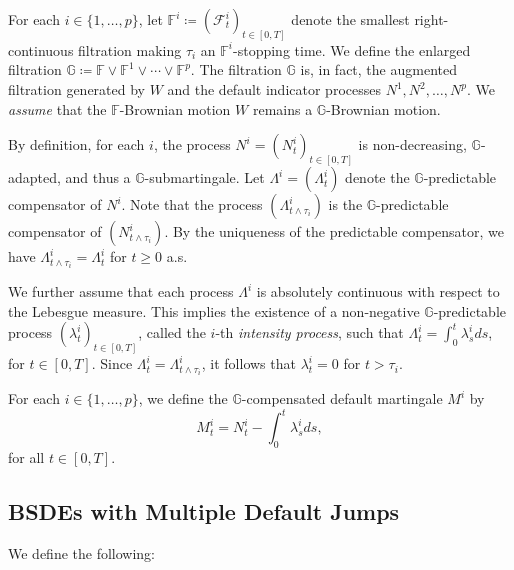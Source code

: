 \documentclass[11pt,a4paper]{article}
\numberwithin{equation}{section}
\theoremstyle{newPlain}
\theoremstyle{newDefinition}
\theoremstyle{newRemark}
\begin{document}
For each $i \in \{1, \ldots, p\}$, let $\mathbb{F}^i \coloneqq (\mathcal{F}_t^i)_{t \in [0, T]}$ denote the smallest right-continuous filtration making $\tau_i$ an $\mathbb{F}^i$-stopping time. We define the enlarged filtration $\mathbb{G} \coloneqq \mathbb{F} \vee \mathbb{F}^1 \vee \cdots \vee \mathbb{F}^p$. The filtration $\mathbb{G}$ is, in fact, the augmented filtration generated by $W$ and the default indicator processes $N^1, N^2, \ldots, N^p$. We \textit{assume} that the $\mathbb{F}$-Brownian motion $W$ remains a $\mathbb{G}$-Brownian motion.

By definition, for each $i$, the process $N^i = (N_t^i)_{t \in [0, T]}$ is non-decreasing, $\mathbb{G}$-adapted, and thus a $\mathbb{G}$-submartingale. Let $\Lambda^i = (\Lambda_t^i)$ denote the $\mathbb{G}$-predictable compensator of $N^i$. Note that the process $(\Lambda_{t \wedge \tau_i}^i)$ is the $\mathbb{G}$-predictable compensator of $(N_{t \wedge \tau_i}^i)$. By the uniqueness of the predictable compensator, we have $\Lambda_{t \wedge \tau_i}^i = \Lambda^i_t$ for $t \ge 0$ a.s.

We further assume that each process $\Lambda^i$ is absolutely continuous with respect to the Lebesgue measure. This implies the existence of a non-negative $\mathbb{G}$-predictable process $(\lambda_t^i)_{t \in [0, T]}$, called the $i$-th \emph{intensity process}, such that $
\Lambda_t^i = \int_0^t \lambda_s^i ds$, for $t \in [0,T]$.
Since $\Lambda_t^i = \Lambda_{t \wedge \tau_i}^i$, it follows that $\lambda_t^i = 0$ for $t > \tau_i$.

For each $i \in \{1, \ldots, p\}$, we define the $\mathbb{G}$-compensated default martingale $M^i$ by
\begin{equation}\label{eq:2.1}
    M_t^i = N_t^i - \int_0^t \lambda_s^i ds,
\end{equation}
for all $t \in [0, T]$.



\subsection{BSDEs with Multiple Default Jumps}\label{sub-section_BSDE}

We define the following:
\end{document}
